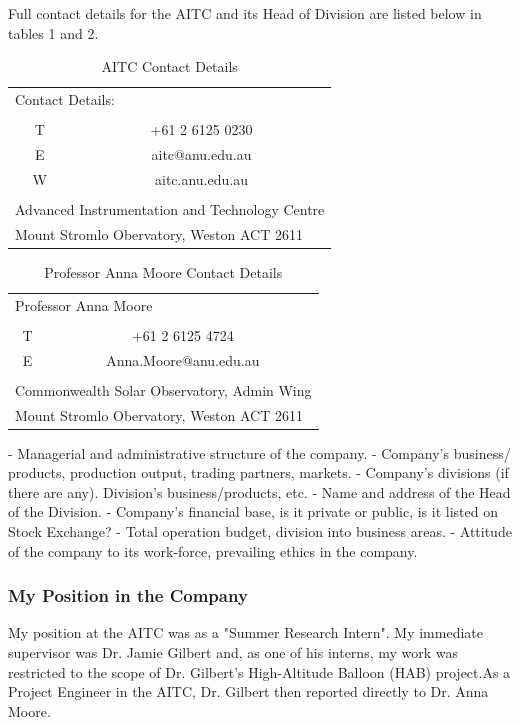 \documentclass[11pt]{article}
\begin{document}
Full contact details for the AITC and its Head of Division are listed below in tables 1 and 2.

\begin{table}[!h] \centering 
 \label{contact} 
 \begin{tabular}{|c  c |} 
 \hline
 \multicolumn{2}{|l|}{Contact Details:} \\
   & \\
 T & +61 2 6125 0230 \\
 E & aitc@anu.edu.au \\
 W & aitc.anu.edu.au \\
   & \\
 \multicolumn{2}{|l|}{Advanced Instrumentation and Technology Centre} \\
 \multicolumn{2}{|l|}{Mount Stromlo Obervatory, Weston ACT 2611} \\
  \hline
   \end{tabular}
\caption{AITC Contact Details}
\end{table}

\begin{table}[!h] \centering 
 \label{moore}
 \begin{tabular}{|c  c |} 
 \hline
  \multicolumn{2}{|l|}{Professor Anna Moore} \\
   & \\
 T & +61 2 6125 4724 \\
 E & Anna.Moore@anu.edu.au \\
   & \\
 \multicolumn{2}{|l|}{Commonwealth Solar Observatory, Admin Wing} \\
 \multicolumn{2}{|l|}{Mount Stromlo Obervatory, Weston ACT 2611} \\
   \hline
   \end{tabular}
\caption{Professor Anna Moore Contact Details}
\end{table}



- Managerial and administrative structure of the company.
- Company's business/ products, production output, trading partners, markets.
- Company's divisions (if there are any). Division's business/products, etc.
- Name and address of the Head of the Division.
- Company's financial base, is it private or public, is it listed on Stock Exchange?
- Total operation budget, division into business areas.
- Attitude of the company to its work-force, prevailing ethics in the company.

\newpage

\subsubsection{My Position in the Company}
My position at the AITC was as a "Summer Research Intern". My immediate supervisor was Dr. Jamie Gilbert and, as one of his interns, my work was restricted to the scope of Dr. Gilbert's High-Altitude Balloon (HAB) project.As a Project Engineer in the AITC, Dr. Gilbert then reported directly to Dr. Anna Moore. \\ 
\end{document}
